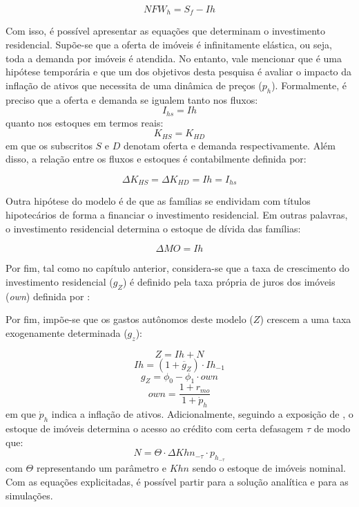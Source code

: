 \begin{equation}
\label{NFWh}
    NFW_h = S_f - Ih
\end{equation}

Com isso, é possível apresentar as equações que determinam o investimento residencial. Supõe-se que a oferta de imóveis é infinitamente elástica, ou seja, toda a demanda por imóveis é atendida. No entanto, vale mencionar que é uma hipótese temporária e que um dos objetivos desta pesquisa é avaliar o impacto da inflação de ativos que necessita de uma dinâmica de preços ($p_h$). Formalmente, é preciso que a oferta e demanda se igualem tanto nos fluxos:
\begin{equation}
    I_{hs} = Ih
\end{equation}
quanto nos estoques em termos reais:
\begin{equation}
    K_{HS} = K_{HD}
\end{equation}
em que os subscritos $S$ e $D$ denotam oferta e demanda respectivamente. Além disso, a relação entre os fluxos e estoques é contabilmente definida por:

\begin{equation}
    \Delta K_{HS} = \Delta K_{HD} = Ih = I_{hs}
\end{equation}

Outra hipótese do modelo é de que as famílias se endividam com títulos hipotecários de forma a financiar o investimento residencial. Em outras palavras, o investimento residencial determina o estoque de dívida das famílias:

\begin{equation}
    \label{EqMO}
    \Delta MO = Ih
\end{equation}

Por fim, tal como no capítulo anterior, considera-se que a taxa de crescimento do investimento residencial ($g_Z$) é definido pela taxa própria de juros dos imóveis (\textit{own}) definida por \textcite{teixeira_crescimento_2015}:


Por fim, impõe-se que os gastos autônomos deste modelo ($Z$) crescem a uma taxa exogenamente determinada ($g_z$):

\begin{equation}
\label{_Z}
    Z = Ih + N
\end{equation}
\begin{equation}
    Ih = (1 + \overline g_Z)\cdot Ih_{-1}
\end{equation}
\begin{equation}
g_Z = \phi_0 - \phi_1\cdot own
\end{equation}
\begin{equation}
own = \frac{1+r_{mo}}{1+\dot p_h}
\end{equation}
em que $\dot p_h$ indica a inflação de ativos. Adicionalmente, seguindo a exposição de \textcite{leamer_housing_2007}, o estoque de imóveis determina o acesso ao crédito com certa defasagem $\tau$ de modo que:
\begin{equation}
N = \Theta\cdot \Delta Khn_{-\tau}\cdot p_{h_{-\tau}}
\end{equation}
com $\Theta$ representando um parâmetro e $Khn$ sendo o estoque de imóveis nominal. Com as equações explicitadas, é possível partir para a solução analítica e para as simulações.

